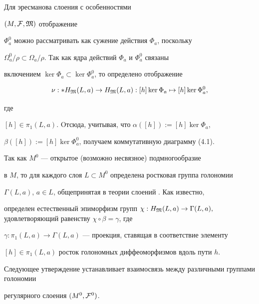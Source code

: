 \begin{pf}


Для эресманова слоения  с особенностями


$(M,{\cal F},\frak M)$ отображение


$\Phi^0_a$ можно рассматривать как сужение действия $\Phi_a$, поскольку


$\Omega^0_a/\rho\subset\Omega_a/\rho$. Так как ядра действий $\Phi_a$ и $\Phi_a^0$ связаны


включением $\ker\Phi_a\subset\ker\Phi_a^0$, то определено отображение


$$


\nu: *H_{\frak M}(L,a)\to H_{\frak M}(L,a): [h]\ker\Phi_a\mapsto


[h]\ker\Phi_a^0,


$$


где


$[h]\in\pi_1(L,a)$. Oтсюда, учитывая, что $\alpha([h]):=[h]\ker\Phi_a$,


$\beta([h]):=[h]\ker\Phi_a^0$, получаем коммутативную диаграмму (4.1).


\end{pf}





Так как $M^0$ --- открытое (возможно несвязное) подмногообразие


в $M$, то для каждого слоя $L\subset M^0$ определена ростковая группа голономии


$\Gamma (L,a)$, $a\in L$, общепринятая в теории слоений \cite{T}. Как известно,


определен естественный эпиморфизм групп $\chi: H_{\frak M}(L,a)\to \Gamma (L,a),


$ удовлетворяющий равенству $\chi\circ \beta=\gamma$, где


$\gamma:\pi_1(L,a)\to\Gamma(L,a)$ --- проекция, ставящая в соответствие элементу


$[h]\in\pi_1(L,a)$ росток голономных диффеоморфизмов вдоль пути $h$.


Следующее утверждение устанавливает взаимосвязь между различными группами голономии


регулярного слоения $(M^0,{\cal F}^0)$.





